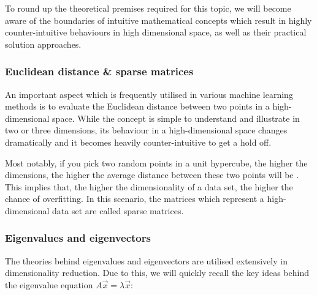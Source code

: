 
To round up the theoretical premises required for this topic, we will become aware of the boundaries of intuitive mathematical concepts which result in highly counter-intuitive behaviours in high dimensional space, as well as their practical solution approaches.

\subsubsection{Euclidean distance \& sparse matrices}

An important aspect which is frequently utilised in various machine learning methods is to evaluate the Euclidean distance between two points in a high-dimensional space.
While the concept is simple to understand and illustrate in two or three dimensions, its behaviour in a high-dimensional space changes dramatically and it becomes heavily counter-intuitive to get a hold off.

Most notably, if you pick two random points in a unit hypercube, the higher the dimensions, the higher the average distance between these two points will be \cite{HandsOnMLCh8}.
This implies that, the higher the dimensionality of a data set, the higher the chance of overfitting.
In this scenario, the matrices which represent a high-dimensional data set are called sparse matrices.

\vspace{2mm}



\subsubsection{Eigenvalues and eigenvectors}

The theories behind eigenvalues and eigenvectors are utilised extensively in dimensionality reduction.
Due to this, we will quickly recall the key ideas behind the eigenvalue equation $A \overrightarrow{x} = \lambda \overrightarrow{x}$:


